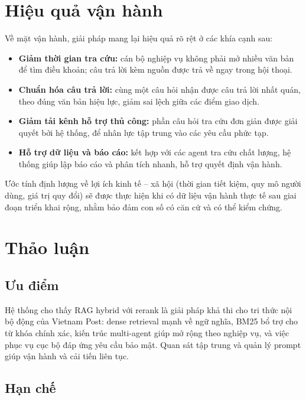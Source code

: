 \section{Hiệu quả vận hành}
\label{sec:hieuqua}

Về mặt vận hành, giải pháp mang lại hiệu quả rõ rệt ở các khía cạnh sau:

\begin{itemize}
  \item \textbf{Giảm thời gian tra cứu:} cán bộ nghiệp vụ không phải mở nhiều văn bản để
  tìm điều khoản; câu trả lời kèm nguồn được trả về ngay trong hội thoại.
  \item \textbf{Chuẩn hóa câu trả lời:} cùng một câu hỏi nhận được câu trả lời nhất quán,
  theo đúng văn bản hiệu lực, giảm sai lệch giữa các điểm giao dịch.
  \item \textbf{Giảm tải kênh hỗ trợ thủ công:} phần câu hỏi tra cứu đơn giản được giải
  quyết bởi hệ thống, để nhân lực tập trung vào các yêu cầu phức tạp.
  \item \textbf{Hỗ trợ dữ liệu và báo cáo:} kết hợp với các agent tra cứu chất lượng, hệ
  thống giúp lập báo cáo và phân tích nhanh, hỗ trợ quyết định vận hành.
\end{itemize}

Ước tính định lượng về lợi ích kinh tế -- xã hội (thời gian tiết kiệm, quy mô người dùng,
giá trị quy đổi) sẽ được thực hiện khi có dữ liệu vận hành thực tế sau giai đoạn triển
khai rộng, nhằm bảo đảm con số có căn cứ và có thể kiểm chứng.

\section{Thảo luận}
\label{sec:thaoluan}

\subsection{Ưu điểm}

Hệ thống cho thấy RAG hybrid với rerank là giải pháp khả thi cho tri thức nội bộ động của
Vietnam Post: dense retrieval mạnh về ngữ nghĩa, BM25 bổ trợ cho từ khóa chính xác, kiến trúc
multi-agent giúp mở rộng theo nghiệp vụ, và việc phục vụ cục bộ đáp ứng yêu cầu bảo mật.
Quan sát tập trung và quản lý prompt giúp vận hành và cải tiến liên tục.

\subsection{Hạn chế}

